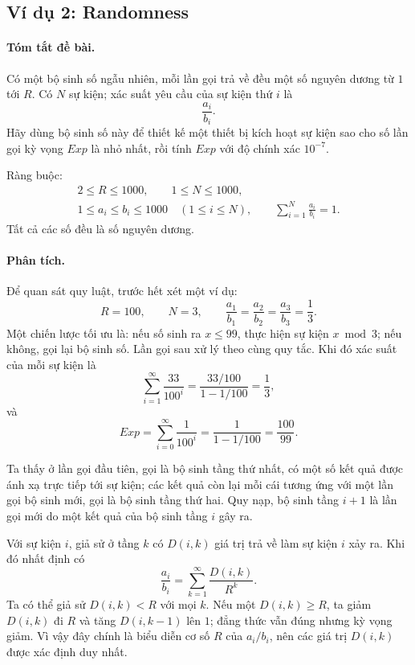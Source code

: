 \documentclass[11pt]{article}
\begin{document}
\subsection{Ví dụ 2: Randomness}

\paragraph{Tóm tắt đề bài.}
Có một bộ sinh số ngẫu nhiên, mỗi lần gọi trả về đều một số nguyên dương từ
\(1\) tới \(R\). Có \(N\) sự kiện; xác suất yêu cầu của sự kiện thứ \(i\) là
\[
  \frac{a_i}{b_i}.
\]
Hãy dùng bộ sinh số này để thiết kế một thiết bị kích hoạt sự kiện sao cho số
lần gọi kỳ vọng \(\mathit{Exp}\) là nhỏ nhất, rồi tính \(\mathit{Exp}\) với độ
chính xác \(10^{-7}\).

Ràng buộc:
\[
\begin{gathered}
  2\le R\le 1000,\qquad 1\le N\le 1000,\\
  1\le a_i\le b_i\le 1000\quad(1\le i\le N),\qquad
  \sum_{i=1}^{N}\frac{a_i}{b_i}=1.
\end{gathered}
\]
Tất cả các số đều là số nguyên dương.

\paragraph{Phân tích.}
Để quan sát quy luật, trước hết xét một ví dụ:
\[
  R=100,\qquad N=3,\qquad
  \frac{a_1}{b_1}=\frac{a_2}{b_2}=\frac{a_3}{b_3}=\frac13.
\]
Một chiến lược tối ưu là: nếu số sinh ra \(x\le 99\), thực hiện sự kiện
\(x\bmod 3\); nếu không, gọi lại bộ sinh số. Lần gọi sau xử lý theo cùng quy
tắc. Khi đó xác suất của mỗi sự kiện là
\[
  \sum_{i=1}^{\infty}\frac{33}{100^i}
  =\frac{33/100}{1-1/100}
  =\frac13,
\]
và
\[
  \mathit{Exp}=
  \sum_{i=0}^{\infty}\frac{1}{100^i}
  =\frac{1}{1-1/100}
  =\frac{100}{99}.
\]

Ta thấy ở lần gọi đầu tiên, gọi là bộ sinh tầng thứ nhất, có một số kết quả
được ánh xạ trực tiếp tới sự kiện; các kết quả còn lại mỗi cái tương ứng với
một lần gọi bộ sinh mới, gọi là bộ sinh tầng thứ hai. Quy nạp, bộ sinh tầng
\(i+1\) là lần gọi mới do một kết quả của bộ sinh tầng \(i\) gây ra.

Với sự kiện \(i\), giả sử ở tầng \(k\) có \(D(i,k)\) giá trị trả về làm sự
kiện \(i\) xảy ra. Khi đó nhất định có
\[
  \frac{a_i}{b_i}=\sum_{k=1}^{\infty}\frac{D(i,k)}{R^k}.
\]
Ta có thể giả sử \(D(i,k)<R\) với mọi \(k\). Nếu một \(D(i,k)\ge R\), ta giảm
\(D(i,k)\) đi \(R\) và tăng \(D(i,k-1)\) lên \(1\); đẳng thức vẫn đúng nhưng
kỳ vọng giảm. Vì vậy đây chính là biểu diễn cơ số \(R\) của
\(a_i/b_i\), nên các giá trị \(D(i,k)\) được xác định duy nhất.
\end{document}
